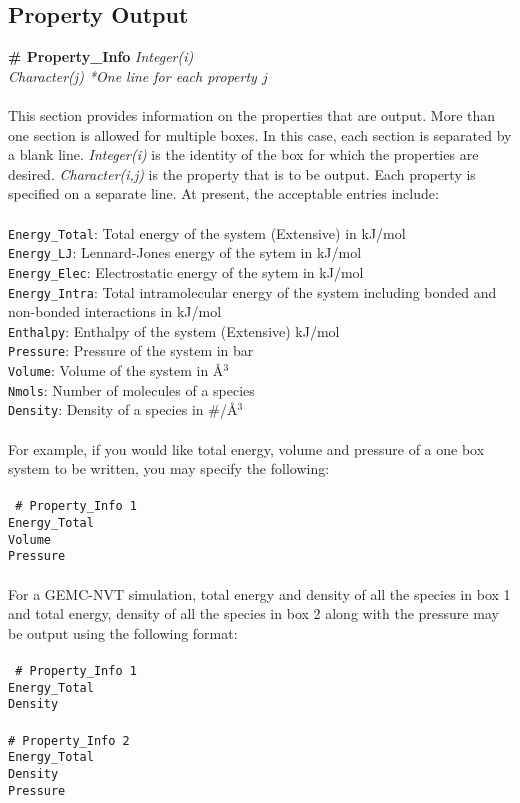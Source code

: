 \subsection{Property Output}\label{sec:Property_Info}
{\bf \# Property\_Info} {\it Integer(i)} \\
{\it Character(j) *One line for each property $j$} \\ \\
%
This section provides information on the properties that are output. More than one section is
allowed for multiple boxes. In this case, each section is separated by a blank line. {\it 
Integer(i)} is the identity of the box for which the properties are desired. {\it Character(i,j)}
is the property that is to be output. Each property is specified on a separate line. At present,
the acceptable entries include: \\ \\
%
\texttt{Energy\_Total}: Total energy of the system (Extensive) in kJ/mol \\
\texttt{Energy\_LJ}: Lennard-Jones energy of the sytem in kJ/mol \\
\texttt{Energy\_Elec}: Electrostatic energy of the sytem in kJ/mol \\
\texttt{Energy\_Intra}: Total intramolecular energy of the system including bonded and non-bonded 
interactions in kJ/mol \\
\texttt{Enthalpy}: Enthalpy of the system (Extensive) kJ/mol \\
\texttt{Pressure}: Pressure of the system in bar \\
\texttt{Volume}: Volume of the system in \AA$^3$ \\
\texttt{Nmols}: Number of molecules of a species \\
\texttt{Density}: Density of a species in \#/\AA$^3$ \\ \\
%
For example, if you would like total energy, volume and pressure of a one box system to be written, you may 
specify the following: \\ \\
%
\texttt{
\# Property\_Info 1 \\
Energy\_Total \\ 
Volume \\ 
Pressure \\ \\}
%
For a GEMC-NVT simulation, total energy and density of all the species in box 1 and total energy, density of
all the species in box 2 along with the pressure may be output using the following format: \\ \\
%
\texttt{
\# Property\_Info 1 \\
Energy\_Total \\
Density \\ \\
%
\# Property\_Info 2 \\
Energy\_Total \\
Density \\ 
Pressure }
%
%
%
